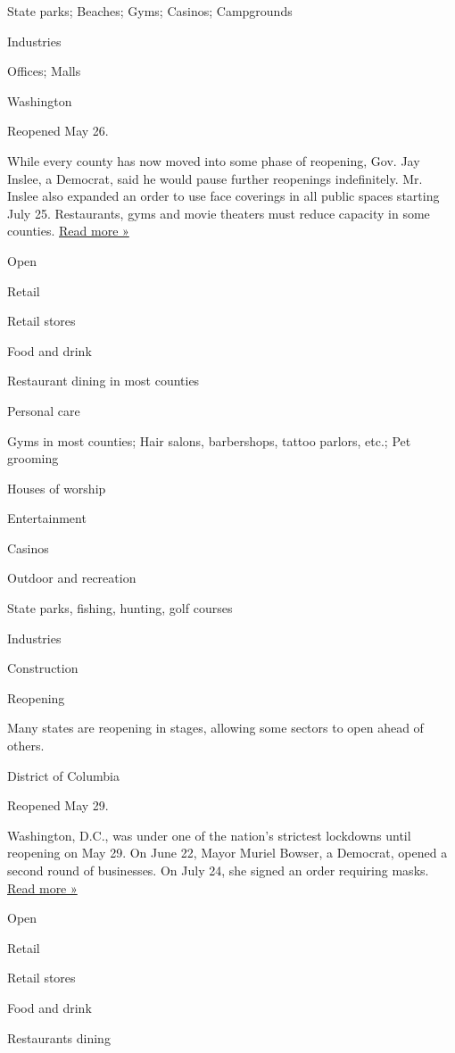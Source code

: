 State parks; Beaches; Gyms; Casinos; Campgrounds

Industries

Offices; Malls

Washington

Reopened May 26.

While every county has now moved into some phase of reopening, Gov. Jay
Inslee, a Democrat, said he would pause further reopenings indefinitely.
Mr. Inslee also expanded an order to use face coverings in all public
spaces starting July 25. Restaurants, gyms and movie theaters must
reduce capacity in some counties.
\href{https://www.seattlepi.com/coronavirus/article/inslee-extends-phase-pause-indefinitely-wa-state-15441125.php}{Read
more »}

Open

Retail

Retail stores

Food and drink

Restaurant dining in most counties

Personal care

Gyms in most counties; Hair salons, barbershops, tattoo parlors, etc.;
Pet grooming

Houses of worship

Entertainment

Casinos

Outdoor and recreation

State parks, fishing, hunting, golf courses

Industries

Construction

Reopening

Many states are reopening in stages, allowing some sectors to open ahead
of others.

District of Columbia

Reopened May 29.

Washington, D.C., was under one of the nation's strictest lockdowns
until reopening on May 29. On June 22, Mayor Muriel Bowser, a Democrat,
opened a second round of businesses. On July 24, she signed an order
requiring masks.
\href{https://dcist.com/story/20/07/29/d-c-just-made-it-harder-to-move-to-phase-three-of-reopening/}{Read
more »}

Open

Retail

Retail stores

Food and drink

Restaurants dining

